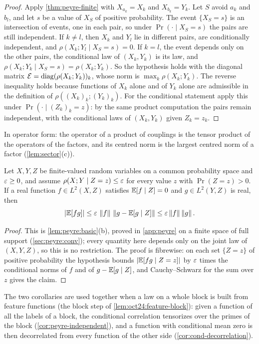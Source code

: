 \begin{proof}
Apply \cref{thm:peyre-finite} with $X_{a_k}=X_k$ and $X_{b_k}=Y_k$. Let $S$
avoid $a_k$ and $b_l$, and let $s$ be a value of $X_S$ of positive probability.
The event $\{X_S=s\}$ is an intersection of events, one in each pair, so under
$\Pr(\cdot\mid X_S=s)$ the pairs are still independent. If $k\ne l$, then
$X_k$ and $Y_l$ lie in different pairs, are conditionally independent, and
$\rho(X_k;Y_l\mid X_S=s)=0$. If $k=l$, the event depends only on the other
pairs, the conditional law of $(X_k,Y_k)$ is its law, and
$\rho(X_k;Y_k\mid X_S=s)=\rho(X_k;Y_k)$. So the hypothesis holds with the
diagonal matrix $\mathcal E=\operatorname{diag}(\rho(X_k;Y_k))_k$, whose norm is
$\max_k\rho(X_k;Y_k)$. The reverse inequality holds because functions of $X_k$
alone and of $Y_k$ alone are admissible in the definition of
$\rho((X_k)_k;(Y_k)_k)$. For the conditional statement apply this under
$\Pr(\cdot\mid(Z_k)_k=z)$: by the same product computation the pairs remain
independent, with the conditional laws of $(X_k,Y_k)$ given $Z_k=z_k$.
\end{proof}

In operator form: the operator of a product of couplings is the tensor product
of the operators of the factors, and its centred norm is the largest centred
norm of a factor (\cref{lem:sector}(c)).

\begin{corollary}\label{cor:cond-decorrelation}
Let $X,Y,Z$ be finite-valued random variables on a common probability space
and $\varepsilon\ge0$, and assume $\rho(X;Y\mid Z=z)\le\varepsilon$ for every value $z$ with
$\Pr(Z=z)>0$. If a real function $f\in L^2(X,Z)$ satisfies $\mathbb E[f\mid Z]=0$ and
$g\in L^2(Y,Z)$ is real, then
\[
 |\mathbb E[fg]|\le\varepsilon\,\left\|f\right\|\,\left\|g-\mathbb E[g\mid Z]\right\|\le\varepsilon\left\|f\right\|\left\|g\right\| .
\]
\end{corollary}

\begin{proof}
This is \cref{lem:peyre:basic}(b), proved in \cref{app:peyre} on a finite space
of full support (\cref{sec:peyre:conv}); every quantity here depends only on
the joint law of $(X,Y,Z)$, so this is no restriction. The proof is fibrewise:
on each set $\{Z=z\}$ of positive probability the hypothesis bounds
$|\mathbb E[fg\mid Z=z]|$ by $\varepsilon$ times the conditional norms of $f$ and of
$g-\mathbb E[g\mid Z]$, and Cauchy--Schwarz for the sum over $z$ gives the claim.
\end{proof}

The two corollaries are used together when a law on a whole block
is built from feature functions (the block step of
\cref{lem:oct24:feature-block}): given a function of all the
labels of a block, the conditional correlation tensorizes over
the primes of the block
(\cref{cor:peyre-independent}), and a function with conditional mean zero is
then decorrelated from every function of the other side
(\cref{cor:cond-decorrelation}).

